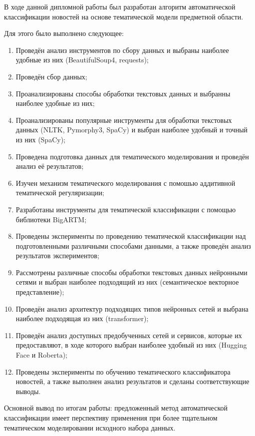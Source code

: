 \documentclass[autoref]{SCWorks}
\begin{document}
\conclusion
В ходе данной дипломной работы был разработан алгоритм автоматической
классификации новостей на основе тематической модели предметной области.

Для этого было выполнено следующее:

\begin{enumerate}
    \item Проведён анализ инструментов по сбору данных и выбраны
    наиболее удобные из них (BeautifulSoup4, requests);
    \item Проведён сбор данных;
    \item Проанализированы способы обработки текстовых данных
    и выбранны наиболее удобные из них;
    \item Проанализированы популярные инструменты для обработки
    текстовых данных (NLTK, Pymorphy3, SpaCy) и выбран наиболее
    удобный и точный из них (SpaCy);
    \item Проведена подготовка данных для тематического моделирования и
    проведён анализ её результатов;
    \item Изучен механизм тематического моделирования с помошью
    аддитивной тематической регуляризации;
    \item Разработаны инструменты для тематической классификации с
    помощью библиотеки BigARTM;
    \item Проведены эксперименты по проведению тематической классификации
    над подготовленными различными способами данными, а также
    проведён анализ результатов экспериментов;
    \item Рассмотрены различные способы обработки текстовых данных нейронными
    сетями и выбран наиболее подходящий из них (семантическое векторное
    представление);
    \item Проведён анализ архитектур подходящих типов нейронных сетей
    и выбрана наиболее подходящая из них (transformer);
    \item Проведён анализ доступных предобученных сетей и сервисов, которые
    их предоставляют, в ходе которого выбран наиболее удобный из них (Hugging
    Face и Roberta);
    \item Проведены эксперименты по обучению тематического классификатора
    новостей, а также выполнен анализ результатов и сделаны соответствующие
    выводы.
\end{enumerate}

Основной вывод по итогам работы: предложенный метод автоматической классификации
имеет перспективу применения при более тщательном тематическом моделировании
исходного набора данных.
\end{document}
